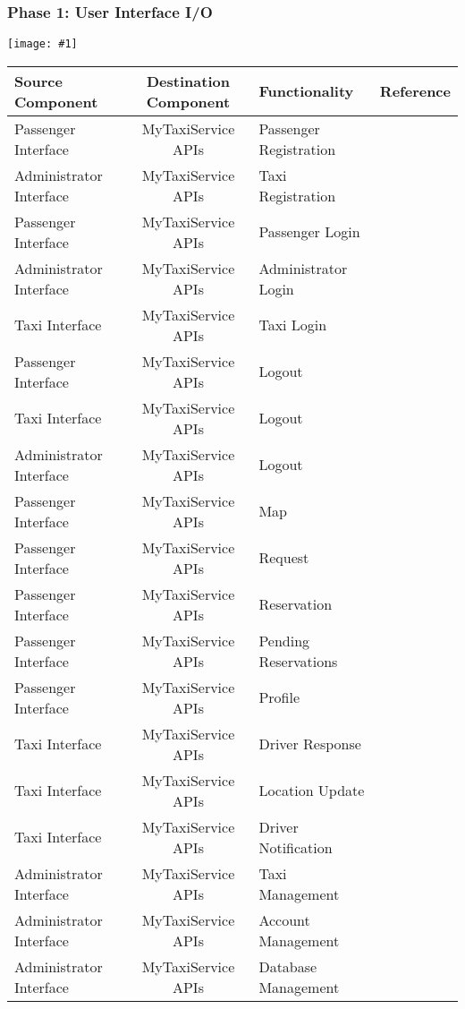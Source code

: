 \documentclass[11pt, a4paper,titlepage]{article}
\newcommand{\image}[1]{
	\begin{center}
		\noindent \texttt{[image: \#1]}
	\end{center}
}
\begin{document}
	\subsubsection{Phase 1: User Interface I/O}
	\image{test_phase1.png}
	\begin{tabularx}{\textwidth}{| X |c |X |c|}
		\hline \textbf{Source Component} &\textbf{ Destination Component}&\textbf{Functionality} & \textbf{Reference} \\
		\hline Passenger Interface & MyTaxiService APIs & Passenger Registration &\\
		\hline Administrator Interface & MyTaxiService APIs & Taxi Registration &\\
		\hline Passenger Interface & MyTaxiService APIs & Passenger Login &\\
		\hline Administrator Interface & MyTaxiService APIs & Administrator Login &\\
		\hline Taxi Interface & MyTaxiService APIs & Taxi Login &\\
		\hline Passenger Interface & MyTaxiService APIs & Logout &\\
		\hline Taxi Interface & MyTaxiService APIs & Logout &\\
		\hline Administrator Interface & MyTaxiService APIs & Logout &\\
		\hline Passenger Interface & MyTaxiService APIs & Map &\\
		\hline Passenger Interface & MyTaxiService APIs & Request &\\
		\hline Passenger Interface & MyTaxiService APIs & Reservation &\\
		\hline Passenger Interface & MyTaxiService APIs & Pending Reservations &\\
		\hline Passenger Interface & MyTaxiService APIs & Profile &\\
		\hline Taxi Interface & MyTaxiService APIs & Driver Response &\\
		\hline Taxi Interface & MyTaxiService APIs & Location Update &\\
		\hline Taxi Interface & MyTaxiService APIs & Driver Notification &\\
		\hline Administrator Interface & MyTaxiService APIs & Taxi Management &\\
		\hline Administrator Interface & MyTaxiService APIs & Account Management &\\
		\hline Administrator Interface & MyTaxiService APIs & Database Management &\\
		\hline
	\end{tabularx}
\end{document}

